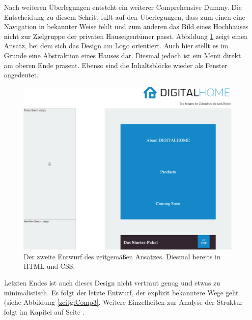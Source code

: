Nach weiteren Überlegungen entsteht ein weiterer Comprehensive Dummy. Die Entscheidung zu diesem Schritt fußt auf den Überlegungen, dass zum einen eine Navigation in bekannter Weise fehlt und zum anderen das Bild eines Hochhauses nicht zur Zielgruppe der privaten Hauseigentümer passt.
Abbildung \ref{zeitg:Comp2} zeigt einen Ansatz, bei dem sich das Design am Logo orientiert. Auch hier stellt es im Grunde eine Abstraktion eines Hauses dar. Diesmal jedoch ist ein Menü direkt am oberen Ende präsent. Ebenso sind die Inhaltsblöcke wieder als Fenster angedeutet.

\begin{figure} [hp]
	\includegraphics[width=\textwidth]{./img/zeitg_comp2.png}
	\caption{Der zweite Entwurf des zeitgemäßen Ansatzes. Diesmal bereits in HTML und CSS.}
	\label{zeitg:Comp2}
\end{figure}

Letzten Endes ist auch dieses Design nicht vertraut genug und etwas zu minimalistisch. Es folgt der letzte Entwurf, der explizit bekanntere Wege geht (siehe Abbildung \ref{zeitg:Comp3}. Weitere Einzelheiten zur Analyse der Struktur folgt im Kapitel  auf Seite \pageref{zeitg:struktur}.

